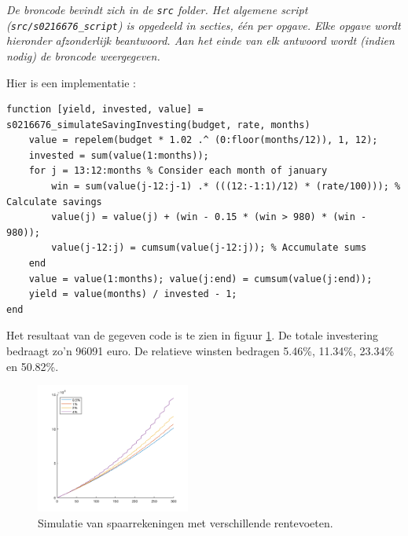 
\begin{center}
\textit{De broncode bevindt zich in de \texttt{src} folder. Het algemene script (\texttt{src/s0216676\_script}) is opgedeeld in secties, \'e\'en per opgave. Elke opgave wordt hieronder afzonderlijk beantwoord. Aan het einde van elk antwoord wordt (indien nodig) de broncode weergegeven.}
\end{center}



Hier is een implementatie :

\begin{lstlisting}
function [yield, invested, value] = s0216676_simulateSavingInvesting(budget, rate, months)
    value = repelem(budget * 1.02 .^ (0:floor(months/12)), 1, 12); 
    invested = sum(value(1:months));
    for j = 13:12:months % Consider each month of january
    	win = sum(value(j-12:j-1) .* (((12:-1:1)/12) * (rate/100))); % Calculate savings
    	value(j) = value(j) + (win - 0.15 * (win > 980) * (win - 980));
        value(j-12:j) = cumsum(value(j-12:j)); % Accumulate sums
    end
    value = value(1:months); value(j:end) = cumsum(value(j:end));
    yield = value(months) / invested - 1;
end
\end{lstlisting}



Het resultaat van de gegeven code is te zien in figuur \ref{fig:op2}. De totale investering bedraagt zo'n 96091 euro. De relatieve winsten bedragen 5.46\%, 11.34\%, 23.34\% en 50.82\%.

\vspace{0.3cm}
\begin{figure}[h]
\centering
\includegraphics[width=0.45\textwidth]{res/op2.png}
\caption{Simulatie van spaarrekeningen met verschillende rentevoeten.}
\label{fig:op2}
\end{figure}

